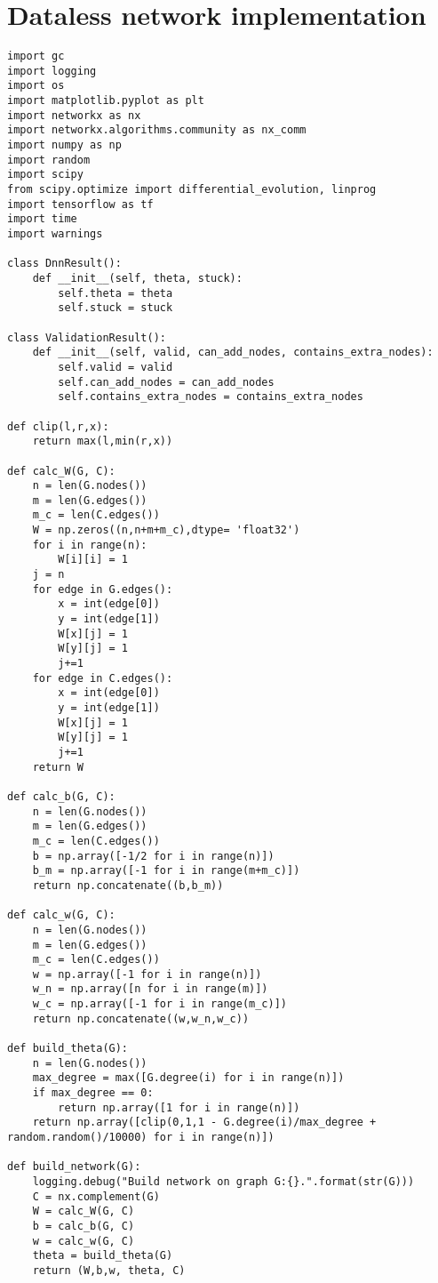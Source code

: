 \renewcommand\chaptername{Appendix}
\chapter{Dataless network implementation}
\begin{lstlisting}
import gc
import logging
import os
import matplotlib.pyplot as plt
import networkx as nx
import networkx.algorithms.community as nx_comm
import numpy as np
import random
import scipy
from scipy.optimize import differential_evolution, linprog
import tensorflow as tf
import time
import warnings

class DnnResult():
    def __init__(self, theta, stuck):
        self.theta = theta
        self.stuck = stuck

class ValidationResult():
    def __init__(self, valid, can_add_nodes, contains_extra_nodes):
        self.valid = valid
        self.can_add_nodes = can_add_nodes
        self.contains_extra_nodes = contains_extra_nodes 

def clip(l,r,x):
    return max(l,min(r,x))

def calc_W(G, C):
    n = len(G.nodes())
    m = len(G.edges())
    m_c = len(C.edges())
    W = np.zeros((n,n+m+m_c),dtype= 'float32')
    for i in range(n):
        W[i][i] = 1
    j = n
    for edge in G.edges():
        x = int(edge[0])
        y = int(edge[1])
        W[x][j] = 1
        W[y][j] = 1
        j+=1
    for edge in C.edges():
        x = int(edge[0])
        y = int(edge[1])
        W[x][j] = 1
        W[y][j] = 1
        j+=1
    return W

def calc_b(G, C):
    n = len(G.nodes())
    m = len(G.edges())
    m_c = len(C.edges())
    b = np.array([-1/2 for i in range(n)])
    b_m = np.array([-1 for i in range(m+m_c)])
    return np.concatenate((b,b_m))

def calc_w(G, C):
    n = len(G.nodes())
    m = len(G.edges())
    m_c = len(C.edges())
    w = np.array([-1 for i in range(n)])
    w_n = np.array([n for i in range(m)])
    w_c = np.array([-1 for i in range(m_c)])
    return np.concatenate((w,w_n,w_c))

def build_theta(G):
    n = len(G.nodes())
    max_degree = max([G.degree(i) for i in range(n)])
    if max_degree == 0:
        return np.array([1 for i in range(n)])
    return np.array([clip(0,1,1 - G.degree(i)/max_degree + random.random()/10000) for i in range(n)])

def build_network(G):
    logging.debug("Build network on graph G:{}.".format(str(G)))
    C = nx.complement(G)
    W = calc_W(G, C)
    b = calc_b(G, C)
    w = calc_w(G, C)
    theta = build_theta(G)
    return (W,b,w, theta, C)


\end{lstlisting}
